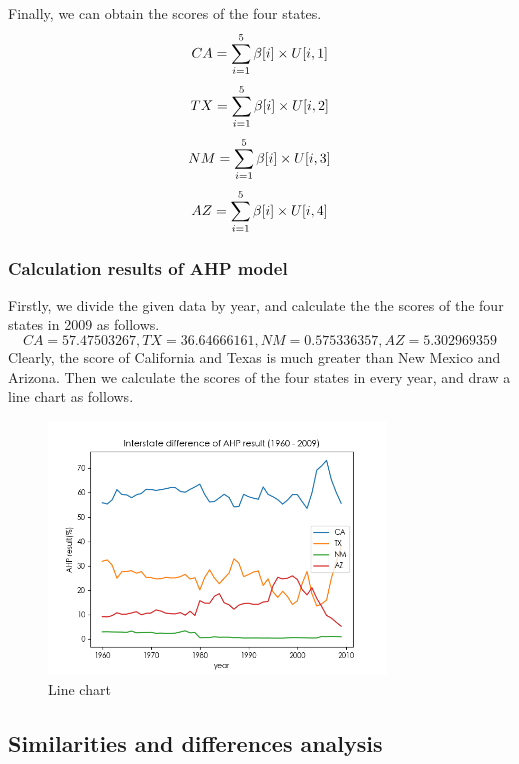 \documentclass[a4paper,11pt]{article}
\begin{document}
\par Finally, we can obtain the scores of the four states.
\begin{equation}
    \centering
    CA=\sum_{i=1}^{5}\beta[i] \times U[i,1]
\end{equation}
\begin{equation}
    \centering
    TX=\sum_{i=1}^{5}\beta[i] \times U[i,2]
\end{equation}
\begin{equation}
    \centering
    NM=\sum_{i=1}^{5}\beta[i] \times U[i,3]
\end{equation}
\begin{equation}
    \centering
    AZ=\sum_{i=1}^{5}\beta[i] \times U[i,4]
\end{equation}

\subsubsection{Calculation results of AHP model}
\par Firstly, we divide the given data by year, and calculate the the scores of the four states in 2009 as follows.
\[
    CA=57.47503267, TX=36.64666161, NM=0.575336357, AZ=5.302969359
\]
Clearly, the score of California and Texas is much greater than New Mexico and Arizona.
Then we calculate the scores of the four states in every year, and draw a line chart as follows.
\begin{figure}[!hptb] 
    \centering 
    \includegraphics[width=0.8\textwidth]{./Pic/B-level-predict.png}
    \caption{Line chart}
    \label{fig:B-level-predict}
\end{figure}

\subsection{Similarities and differences analysis}
\end{document}

